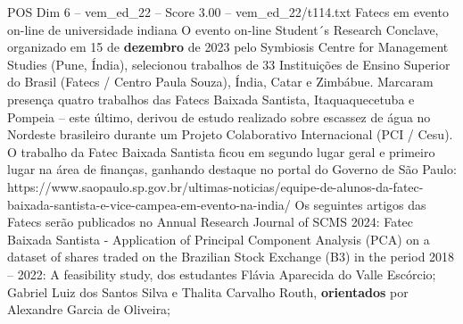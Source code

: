 \begin{textsample}{POS Dim 6 – vem\_ed\_22 – Score 3.00 – vem\_ed\_22/t114.txt}  \label{ex:f6_pos_046}
Fatecs em evento on-line de universidade indiana O evento on-line Student´s Research Conclave, organizado em 15 de \textbf{dezembro} de 2023 pelo Symbiosis Centre for Management Studies (Pune, Índia), selecionou trabalhos de 33 Instituições de Ensino Superior do Brasil (Fatecs / Centro Paula Souza), Índia, Catar e Zimbábue.
Marcaram presença quatro trabalhos das Fatecs Baixada Santista, Itaquaquecetuba e Pompeia – este último, derivou de estudo realizado sobre escassez de água no Nordeste brasileiro durante um Projeto Colaborativo Internacional (PCI / Cesu).
O trabalho da Fatec Baixada Santista ficou em segundo lugar geral e primeiro lugar na área de finanças, ganhando destaque no portal do Governo de São Paulo: https://www.saopaulo.sp.gov.br/ultimas-noticias/equipe-de-alunos-da-fatec-baixada-santista-e-vice-campea-em-evento-na-india/ Os seguintes artigos das Fatecs serão publicados no Annual Research Journal of SCMS 2024: Fatec Baixada Santista - Application of Principal Component Analysis (PCA) on a dataset of shares traded on the Brazilian Stock Exchange (B3) in the period 2018 – 2022: A feasibility study, dos estudantes Flávia Aparecida do Valle Escórcio; Gabriel Luiz dos Santos Silva e Thalita Carvalho Routh, \textbf{orientados} por Alexandre Garcia de Oliveira;

\end{textsample}
